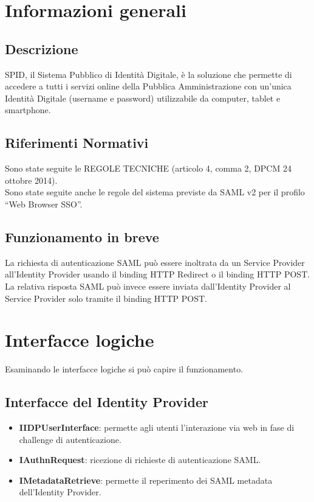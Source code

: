 \section{Informazioni generali}

\subsection{Descrizione}
SPID, il Sistema Pubblico di Identità Digitale, è la soluzione che permette di accedere a tutti i servizi online della Pubblica Amministrazione con un'unica Identità Digitale (username e password) utilizzabile da computer, tablet e smartphone.
\subsection{Riferimenti Normativi}
Sono state seguite le REGOLE TECNICHE (articolo 4, comma 2, DPCM 24 ottobre 2014).
\\ Sono state seguite anche le regole del sistema previste da SAML v2 per il profilo “Web
Browser SSO”.
\subsection{Funzionamento in breve}
La richiesta di autenticazione SAML può essere inoltrata 
da un Service Provider all’Identity Provider
usando il binding HTTP Redirect o il binding HTTP POST.
\\ La relativa risposta SAML può invece essere inviata
dall’Identity Provider al Service Provider 
solo tramite il binding HTTP POST.

\section{Interfacce logiche}
Esaminando le interfacce logiche si può capire il funzionamento.
\subsection{Interfacce del Identity Provider}
\begin{itemize}
    \item \textbf{IIDPUserInterface}: permette agli utenti l’interazione via web in fase di challenge di autenticazione.
    \item \textbf{IAuthnRequest}: ricezione di richieste di autenticazione SAML.
    \item \textbf{IMetadataRetrieve}: permette il reperimento dei SAML metadata dell’Identity Provider.
\end{itemize}
